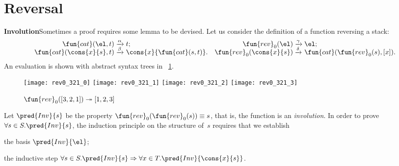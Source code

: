 \section{Reversal}
\label{sec:reversal}


\textbf{Involution}\quad Sometimes a
proof requires some lemma to be devised. Let us consider the
definition of a function
\label{def:rev0}
reversing a stack:
\begin{equation*}
\begin{array}{@{}r@{\;}l@{\;}lr@{\;}l@{\;}l@{}}
  \fun{cat}(\el,t)\index{cat@\fun{cat/2}}
& \xrightarrow{\smash{\alpha}} & t;
& \fun{rev}_0(\el)
& \xrightarrow{\smash{\gamma}} & \el;\\
  \fun{cat}(\cons{x}{s},t)
& \xrightarrow{\smash{\beta}} & \cons{x}{\fun{cat}(s,t)}.
& \fun{rev}_0(\cons{x}{s})
& \xrightarrow{\smash{\delta}} & \fun{cat}(\fun{rev}_0(s),[x]).
\end{array}
\end{equation*}
An evaluation is shown with abstract syntax trees in
\fig~\ref{fig:rev0_321}.
\begin{figure}[!b]
\centering
\texttt{[image: rev0\_321\_0]}
\texttt{[image: rev0\_321\_1]}
\texttt{[image: rev0\_321\_2]}
\texttt{[image: rev0\_321\_3]}
\caption{\(\fun{rev}_0([3,2,1]) \twoheadrightarrow [1,2,3]\)}
\label{fig:rev0_321}
\end{figure}
Let \(\pred{Inv}{s}\) be the property
\(\fun{rev}_0(\fun{rev}_0(s)) \equiv s\), that is, the function
 is an
\emph{involution}. In order to prove
\(\forall s \in S.\pred{Inv}{s}\), the induction principle on the
structure of~\(s\) requires that we
establish
\begin{itemize*}

  \item the basis \(\pred{Inv}{\el}\);

  \item the inductive step \(\forall s \in S.\pred{Inv}{s}
    \Rightarrow \forall x \in T.\pred{Inv}{\cons{x}{s}}\).

\end{itemize*}
